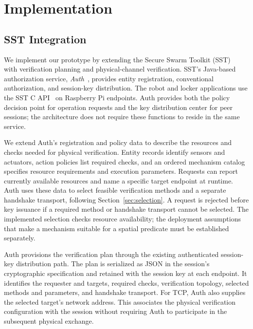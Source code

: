 \documentclass[sigconf,authordraft]{acmart}
\begin{document}
\section{Implementation}
\label{sec:implementation}

\subsection{SST Integration}
\label{sec:implementation-overview}

We implement our prototype by extending the Secure Swarm Toolkit (SST)~\cite{kim2017toolkit} with verification planning and physical-channel verification.
SST's Java-based authorization service, \emph{Auth}~\cite{kim2016secure}, provides entity registration, conventional authorization, and session-key distribution.
The robot and locker applications use the SST C API~\cite{kim2023sst} on Raspberry Pi endpoints.
Auth provides both the policy decision point for operation requests and the key distribution center for peer sessions; the architecture does not require these functions to reside in the same service.

We extend Auth's registration and policy data to describe the resources and checks needed for physical verification.
Entity records identify sensors and actuators, action policies list required checks, and an ordered mechanism catalog specifies resource requirements and execution parameters.
Requests can report currently available resources and name a specific target endpoint at runtime.
Auth uses these data to select feasible verification methods and a separate handshake transport, following Section~\ref{sec:selection}.
A request is rejected before key issuance if a required method or handshake transport cannot be selected.
The implemented selection checks resource availability; the deployment assumptions that make a mechanism suitable for a spatial predicate must be established separately.

Auth provisions the verification plan through the existing authenticated session-key distribution path.
The plan is serialized as JSON in the session's cryptographic specification and retained with the session key at each endpoint.
It identifies the requester and targets, required checks, verification topology, selected methods and parameters, and handshake transport.
For TCP, Auth also supplies the selected target's network address.
This associates the physical verification configuration with the session without requiring Auth to participate in the subsequent physical exchange.
\end{document}
